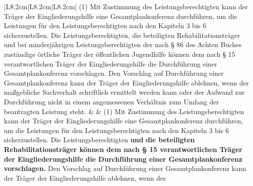 \documentclass[10pt,a4paper,landscape]{article}
\begin{document}
\begin{longtable}{|L{8.2cm}|L{8.2cm}|L{8.2cm}|}
\hhline{|---|}
(1) Mit Zustimmung des  \newline Leistungsberechtigten kann der Träger der  \newline Eingliederungshilfe eine  \newline Gesamtplankonferenz durchführen, um die  \newline Leistungen für den Leistungsberechtigten  \newline nach den Kapiteln 3 bis 6 sicherzustellen.  \newline Die \textcolor{diffred}{Leistungsberechtigten,} die beteiligten  \newline Rehabilitationsträger \textcolor{diffred}{und bei  \newline minderjährigen Leistungsberechtigten der  \newline nach \S{} 86 des Achten Buches zuständige  \newline örtliche Träger der öffentlichen Jugendhilfe}  \newline können dem nach \S{} 15 verantwortlichen  \newline Träger der Eingliederungshilfe die  \newline Durchführung einer Gesamtplankonferenz  \newline vorschlagen. Den Vorschlag auf  \newline Durchführung einer Gesamtplankonferenz  \newline kann der Träger der Eingliederungshilfe  \newline ablehnen, wenn der maßgebliche  \newline Sachverhalt schriftlich ermittelt werden  \newline kann oder der Aufwand zur Durchführung  \newline nicht in einem angemessenen Verhältnis  \newline zum Umfang der beantragten Leistung  \newline steht. &  & (1) Mit Zustimmung des  \newline Leistungsberechtigten kann der Träger der  \newline Eingliederungshilfe eine  \newline Gesamtplankonferenz durchführen, um die  \newline Leistungen für den Leistungsberechtigten  \newline nach den Kapiteln 3 bis 6 sicherzustellen.  \newline Die \textcolor{diffgreen}{Leistungsberechtigten }\textbf{\textcolor{diffgreen}{und}}\textbf{ die  \newline beteiligten Rehabilitationsträger können  \newline dem nach \S{} 15 verantwortlichen Träger  \newline der Eingliederungshilfe die  \newline Durchführung einer  \newline Gesamtplankonferenz vorschlagen. }Den  \newline Vorschlag auf Durchführung einer  \newline Gesamtplankonferenz kann der Träger der  \newline Eingliederungshilfe ablehnen, wenn der  
\end{longtable}
\end{document}
